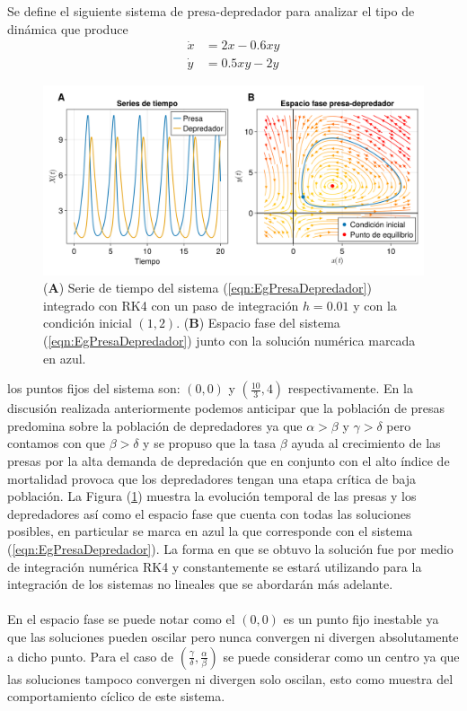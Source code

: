 \begin{ejemplo}\label{eg:PresaDepredador}
	Se define el siguiente sistema de presa-depredador para analizar el tipo de dinámica que produce
	\begin{equation}\label{eqn:EgPresaDepredador}
		\begin{split}
			\dot{x} &= 2x-0.6xy \\
			\dot{y} &= 0.5xy-2y
		\end{split}
	\end{equation}
	\begin{figure}[h!]
		\centering
		\includegraphics[scale=0.215]{../Imagenes/Espacio fase PD}
		\caption{(\textbf{A}) Serie de tiempo del sistema (\ref{eqn:EgPresaDepredador}) integrado con RK4 con un paso de integración $h=0.01$ y con la condición inicial $(1,2)$. (\textbf{B}) Espacio fase del sistema (\ref{eqn:EgPresaDepredador}) junto con la solución numérica marcada en azul.}
		\label{fig:EspacioFasePD}
	\end{figure}
	los puntos fijos del sistema son: $(0,0)$ y $(\frac{10}{3},4)$ respectivamente. En la discusión realizada anteriormente podemos anticipar que la población de presas predomina sobre la población de depredadores ya que $\alpha>\beta$ y $\gamma>\delta$ pero contamos con que $\beta>\delta$ y se propuso que la tasa $\beta$ ayuda al crecimiento de las presas por la alta demanda de depredación que en conjunto con el alto índice de mortalidad provoca que los depredadores tengan una etapa crítica de baja población. La Figura (\ref{fig:EspacioFasePD}) muestra la evolución temporal de las presas y los depredadores así como el espacio fase que cuenta con todas las soluciones posibles, en particular se marca en azul la que corresponde con el sistema (\ref{eqn:EgPresaDepredador}). La forma en que se obtuvo la solución fue por medio de integración numérica RK4 y constantemente se estará utilizando para la integración de los sistemas no lineales que se abordarán más adelante.\\
	\\
	En el espacio fase se puede notar como el $(0,0)$ es un punto fijo inestable ya que las soluciones pueden oscilar pero nunca convergen ni divergen absolutamente a dicho punto. Para el caso de $(\frac{\gamma}{\delta},\frac{\alpha}{\beta})$ se puede considerar como un centro ya que las soluciones tampoco convergen ni divergen solo oscilan, esto como muestra del comportamiento cíclico de este sistema.
	
\end{ejemplo}
